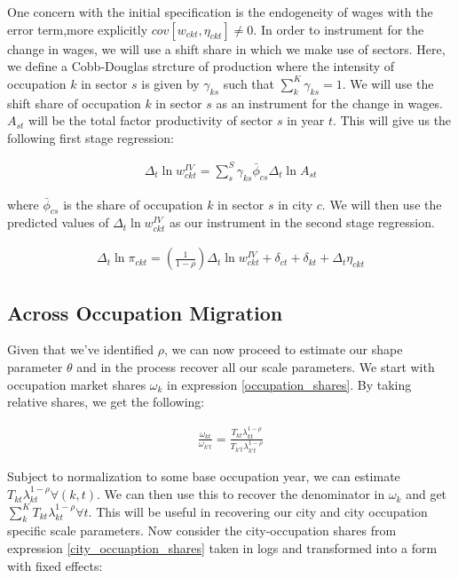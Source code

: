 \documentclass[10pt]{article}
\begin{document}
One concern with the initial specification is the endogeneity of wages with the error term,more explicitly $cov[w_{ckt}, \eta_{ckt}] \neq 0$. In order to instrument for the change in wages, we will use a shift share in which we make use of sectors. Here, we define a Cobb-Douglas strcture of production where the intensity of occupation $k$ in sector $s$ is given by $\gamma_{ks}$ such that $\sum_{k}^{K} \gamma_{ks} = 1$. We will use the shift share of occupation $k$ in sector $s$ as an instrument for the change in wages. $A_{st}$ will be the total factor productivity of sector $s$ in year $t$. This will give us the following first stage regression:

\begin{align*}
    \Delta_t \ln w_{ckt}^{IV} = \sum_{s}^{S} \gamma_{ks} \bar{\phi}_{cs} \Delta_t \ln A_{st}
\end{align*}

where $\bar{\phi}_{cs}$ is the  share of occupation $k$ in sector $s$ in city $c$. We will then use the predicted values of $\Delta_t \ln w_{ckt}^{IV}$ as our instrument in the second stage regression.

\begin{align*}
    \Delta_t \ln \pi_{ckt} = \left( \frac{1}{1 - \rho} \right) \Delta_t \ln w_{ckt}^{IV} + \delta_{ct} + \delta_{kt} + \Delta_t \eta_{ckt}
\end{align*}

\subsection{Across Occupation Migration}

Given that we've identified $\rho$, we can now proceed to estimate our shape parameter $\theta$ and in the process recover all our scale parameters. We start with occupation market shares $\omega_k$ in expression \ref{occupation_shares}. By taking relative shares, we get the following:

\begin{align*}
    \frac{\omega_{kt}}{\omega_{k't}} = \frac{T_{kt} \lambda_{kt}^{1 - \rho}}{T_{k't} \lambda_{k't}^{1 - \rho}}
\end{align*}

Subject to normalization to some base occupation year, we can estimate $T_{kt} \lambda_{kt}^{1 - \rho} \forall (k, t)$. We can then use this to recover the denominator in $\omega_k$ and get $\sum_{k}^{K} T_{kt} \lambda_{kt}^{1 - \rho} \forall t$. This will be useful in recovering our city and city occupation specific scale parameters. Now consider the city-occupation shares from expression \ref{city_occuaption_shares} taken in logs and transformed into a form with fixed effects:
\end{document}
